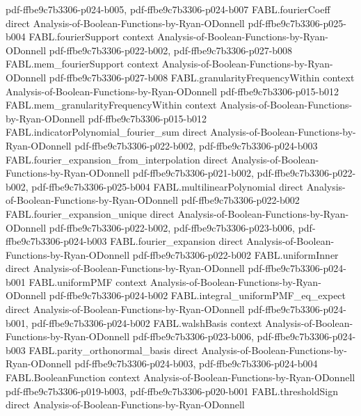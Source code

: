\begin{theorem}
{    pdf-ffbe9c7b3306-p024-b005,
    pdf-ffbe9c7b3306-p024-b007}
\proofstep
  {FABL.fourierCoeff}
  {direct}
  {Analysis-of-Boolean-Functions-by-Ryan-ODonnell}
  {pdf-ffbe9c7b3306-p025-b004}
\proofstep
  {FABL.fourierSupport}
  {context}
  {Analysis-of-Boolean-Functions-by-Ryan-ODonnell}
  {pdf-ffbe9c7b3306-p022-b002,
    pdf-ffbe9c7b3306-p027-b008}
\proofstep
  {FABL.mem_fourierSupport}
  {context}
  {Analysis-of-Boolean-Functions-by-Ryan-ODonnell}
  {pdf-ffbe9c7b3306-p027-b008}
\proofstep
  {FABL.granularityFrequencyWithin}
  {context}
  {Analysis-of-Boolean-Functions-by-Ryan-ODonnell}
  {pdf-ffbe9c7b3306-p015-b012}
\proofstep
  {FABL.mem_granularityFrequencyWithin}
  {context}
  {Analysis-of-Boolean-Functions-by-Ryan-ODonnell}
  {pdf-ffbe9c7b3306-p015-b012}
\proofstep
  {FABL.indicatorPolynomial_fourier_sum}
  {direct}
  {Analysis-of-Boolean-Functions-by-Ryan-ODonnell}
  {pdf-ffbe9c7b3306-p022-b002,
    pdf-ffbe9c7b3306-p024-b003}
\proofstep
  {FABL.fourier_expansion_from_interpolation}
  {direct}
  {Analysis-of-Boolean-Functions-by-Ryan-ODonnell}
  {pdf-ffbe9c7b3306-p021-b002,
    pdf-ffbe9c7b3306-p022-b002,
    pdf-ffbe9c7b3306-p025-b004}
\proofstep
  {FABL.multilinearPolynomial}
  {direct}
  {Analysis-of-Boolean-Functions-by-Ryan-ODonnell}
  {pdf-ffbe9c7b3306-p022-b002}
\proofstep
  {FABL.fourier_expansion_unique}
  {direct}
  {Analysis-of-Boolean-Functions-by-Ryan-ODonnell}
  {pdf-ffbe9c7b3306-p022-b002,
    pdf-ffbe9c7b3306-p023-b006,
    pdf-ffbe9c7b3306-p024-b003}
\proofstep
  {FABL.fourier_expansion}
  {direct}
  {Analysis-of-Boolean-Functions-by-Ryan-ODonnell}
  {pdf-ffbe9c7b3306-p022-b002}
\proofstep
  {FABL.uniformInner}
  {direct}
  {Analysis-of-Boolean-Functions-by-Ryan-ODonnell}
  {pdf-ffbe9c7b3306-p024-b001}
\proofstep
  {FABL.uniformPMF}
  {context}
  {Analysis-of-Boolean-Functions-by-Ryan-ODonnell}
  {pdf-ffbe9c7b3306-p024-b002}
\proofstep
  {FABL.integral_uniformPMF_eq_expect}
  {direct}
  {Analysis-of-Boolean-Functions-by-Ryan-ODonnell}
  {pdf-ffbe9c7b3306-p024-b001,
    pdf-ffbe9c7b3306-p024-b002}
\proofstep
  {FABL.walshBasis}
  {context}
  {Analysis-of-Boolean-Functions-by-Ryan-ODonnell}
  {pdf-ffbe9c7b3306-p023-b006,
    pdf-ffbe9c7b3306-p024-b003}
\proofstep
  {FABL.parity_orthonormal_basis}
  {direct}
  {Analysis-of-Boolean-Functions-by-Ryan-ODonnell}
  {pdf-ffbe9c7b3306-p024-b003,
    pdf-ffbe9c7b3306-p024-b004}
\proofstep
  {FABL.BooleanFunction}
  {context}
  {Analysis-of-Boolean-Functions-by-Ryan-ODonnell}
  {pdf-ffbe9c7b3306-p019-b003,
    pdf-ffbe9c7b3306-p020-b001}
\proofstep
  {FABL.thresholdSign}
  {direct}
  {Analysis-of-Boolean-Functions-by-Ryan-ODonnell}

\end{theorem}
